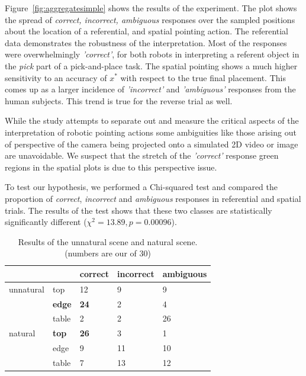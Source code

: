 Figure~\ref{fig:aggregatesimple} shows the results of the experiment. The plot shows the spread of \textit{correct, incorrect, ambiguous} responses over the sampled positions about the location of a referential, and spatial pointing action. The referential data demonstrates the robustness of the interpretation. Most of the responses were overwhelmingly \textit{'correct'}, for both robots in interpreting a referent object in the \textit{pick} part of a pick-and-place task. The spatial pointing shows a much higher sensitivity to an accuracy of $x^*$ with respect to the true final placement. This comes up as a larger incidence of \textit{'incorrect'} and \textit{'ambiguous'} responses from the human subjects. This trend is true for the reverse trial as well.

While the study attempts to separate out and measure the critical aspects of the interpretation of robotic pointing actions some ambiguities like those arising out of perspective of the camera being projected onto a simulated 2D video or image are unavoidable. We suspect that the stretch of the \textit{'correct'} response green regions in the spatial plots is due to this perspective issue.

To test our hypothesis, we performed a Chi-squared test and compared the proportion of \textit{correct}, \textit{incorrect} and \textit{ambiguous} responses in referential and spatial trials. The results of the test shows that these two classes are statistically significantly different ($\chi^2= 13.89, p = 0.00096$).

\begin{table}[h]
\label{tab:naturaltrial}
\begin{tabular}{lllll}
          &               & correct     & incorrect & ambiguous \\ \hline
unnatural & top           & 12          & 9         & 9         \\
          & \textbf{edge} & \textbf{24} & 2         & 4         \\
          & table         & 2           & 2         & 26        \\ \hline
natural   & \textbf{top}  & \textbf{26} & 3         & 1         \\
          & edge          & 9           & 11        & 10        \\
          & table         & 7           & 13        & 12        \\ \hline
\end{tabular}
\caption{Results of the unnatural scene and natural scene. (numbers are our of 30) }
\label{tab:natural-unnatural}
\end{table} \\

